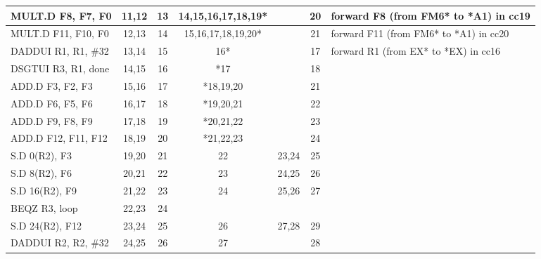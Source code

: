 \begin{table}[htp]
{\begin{tabular}{|l|c|c|c|c|c|l|}
	MULT.D     F8, F7, F0           & 11,12 & 13 & 14,15,16,17,18,19* &       & 20 & forward   F8 (from FM6* to *A1) in cc19 \\ \hline
	MULT.D     F11, F10, F0 & 12,13      & 14 & 15,16,17,18,19,20* &             & 21 & forward   F11 (from FM6* to *A1) in cc20 \\ \hline
	DADDUI     R1, R1, \#32         & 13,14 & 15 & 16*                &       & 17 & forward R1 (from EX*   to *EX) in cc16  \\ \hline
	DSGTUI     R3, R1, done         & 14,15 & 16 & *17                &       & 18 &                                         \\ \hline
	ADD.D       F3, F2, F3          & 15,16 & 17 & *18,19,20          &       & 21 &                                         \\ \hline
	ADD.D       F6, F5, F6          & 16,17 & 18 & *19,20,21          &       & 22 &                                         \\ \hline
	ADD.D       F9, F8, F9          & 17,18 & 19 & *20,21,22          &       & 23 &                                         \\ \hline
	ADD.D       F12, F11, F12       & 18,19 & 20 & *21,22,23          &       & 24 &                                         \\ \hline
	S.D            0(R2), F3        & 19,20 & 21 & 22                 & 23,24 & 25 &                                         \\ \hline
	S.D            8(R2), F6        & 20,21 & 22 & 23                 & 24,25 & 26 &                                         \\ \hline
	S.D            16(R2), F9       & 21,22 & 23 & 24                 & 25,26 & 27 &                                         \\ \hline
	BEQZ         R3, loop           & 22,23 & 24 &                    &       &    &                                         \\ \hline
	S.D            24(R2), F12      & 23,24 & 25 & 26                 & 27,28 & 29 &                                         \\ \hline
	DADDUI     R2, R2, \#32         & 24,25 & 26 & 27                 &       & 28 &                                         \\ \hline
\end{tabular}
}
\end{table}